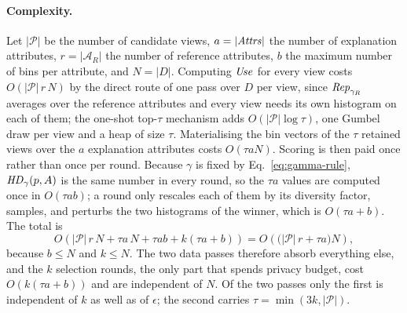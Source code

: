 \paragraph{Complexity.}
\label{subsec:complexity-analysis}
Let $|\mathcal{P}|$ be the number of candidate views, $a=|\mathit{Attrs}|$ the number of explanation attributes, $r=|\mathcal{A}_R|$ the number of reference attributes, $b$ the maximum number of bins per attribute, and $N=|D|$.
Computing $\mathit{Use}$ for every view costs $O(|\mathcal{P}|\,r\,N)$ by the direct route of one pass over $D$ per view, since $\mathit{Rep}_{\gamma_R}$ averages over the reference attributes and every view needs its own histogram on each of them; the one-shot top-$\tau$ mechanism adds $O(|\mathcal{P}|\log\tau)$, one Gumbel draw per view and a heap of size $\tau$.
Materialising the bin vectors of the $\tau$ retained views over the $a$ explanation attributes costs $O(\tau a N)$.
Scoring is then paid once rather than once per round.
Because $\gamma$ is fixed by Eq.~\eqref{eq:gamma-rule}, $\mathit{HD}_\gamma(p,A)$ is the same number in every round, so the $\tau a$ values are computed once in $O(\tau a b)$; a round only rescales each of them by its diversity factor, samples, and perturbs the two histograms of the winner, which is $O(\tau a+b)$.
The total is
\[
O\!\left(|\mathcal{P}|\,r\,N + \tau a\, N + \tau a b + k(\tau a + b)\right)
= O\!\left(\big(|\mathcal{P}|\,r + \tau a\big)N\right),
\]
because $b\le N$ and $k\le N$.
The two data passes therefore absorb everything else, and the $k$ selection rounds, the only part that spends privacy budget, cost $O(k(\tau a+b))$ and are independent of $N$.
Of the two passes only the first is independent of $k$ as well as of $\epsilon$; the second carries $\tau=\min(3k,|\mathcal{P}|)$.


